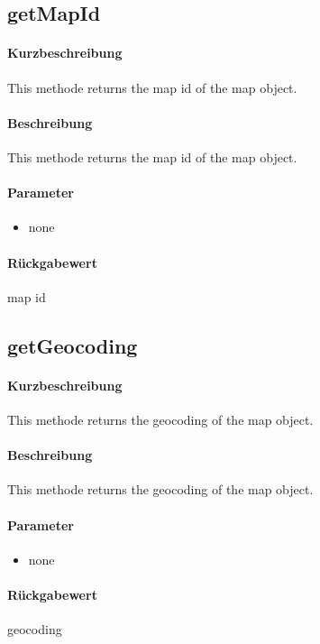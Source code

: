 \subsection{getMapId}
\paragraph*{Kurzbeschreibung}
This methode returns the map id of the map object.
\paragraph*{Beschreibung}
This methode returns the map id of the map object.
\paragraph*{Parameter}
\begin{itemize}
    \item none
\end{itemize}
\paragraph*{Rückgabewert}
map id

\subsection{getGeocoding}
\paragraph*{Kurzbeschreibung}
This methode returns the geocoding of the map object.
\paragraph*{Beschreibung}
This methode returns the geocoding of the map object.
\paragraph*{Parameter}
\begin{itemize}
    \item none
\end{itemize}
\paragraph*{Rückgabewert}
geocoding